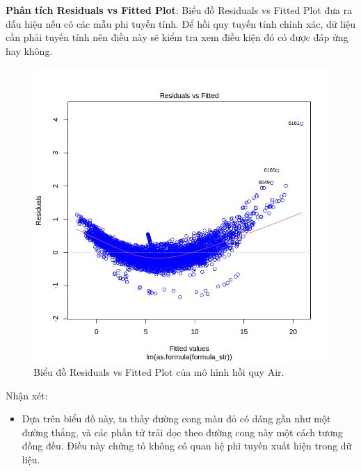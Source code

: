 \textbf{Phân tích Residuals vs Fitted Plot}: Biểu đồ Residuals vs Fitted Plot đưa ra dấu hiệu nếu có các mẫu phi tuyến tính. Để hồi quy tuyến tính chính xác, dữ liệu cần phải tuyến tính nên điều này sẽ kiểm tra xem điều kiện đó có được đáp ứng hay không.

\begin{figure}[H]
    \centering
    \includegraphics[width=0.75\columnwidth]{air_figures/best_model_air_residual_fitted.png}
    \caption{Biểu đồ Residuals vs Fitted Plot của mô hình hồi quy Air.}
    \label{fig:best_model_air_residual_fitted}
\end{figure}
Nhận xét:
\begin{itemize}
    \item Dựa trên biểu đồ này, ta thấy đường cong màu đỏ có dáng gần như một đường thẳng, và các phần tử trải dọc theo đường cong này một cách tương đồng đều. Điều này chứng tỏ không có quan hệ phi tuyến xuất hiện trong dữ liệu.
\end{itemize}


